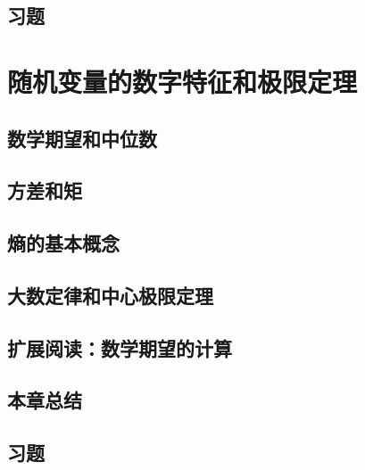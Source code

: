 \documentclass[UTF8,12pt,a4paper,fontset=fandol]{ctexbook}
\begin{document}
\section*{习题}

\chapter{随机变量的数字特征和极限定理}
\label{chap:study-moments-limits}

\section{数学期望和中位数}
\label{sec:study-expectation-median}

\section{方差和矩}
\label{sec:study-variance-moments}

\section{熵的基本概念}
\label{sec:study-entropy}

\section{大数定律和中心极限定理}
\label{sec:study-limit-theorems}

\section{扩展阅读：数学期望的计算}
\label{sec:study-expectation-calculation}

\section*{本章总结}

\section*{习题}
\end{document}
